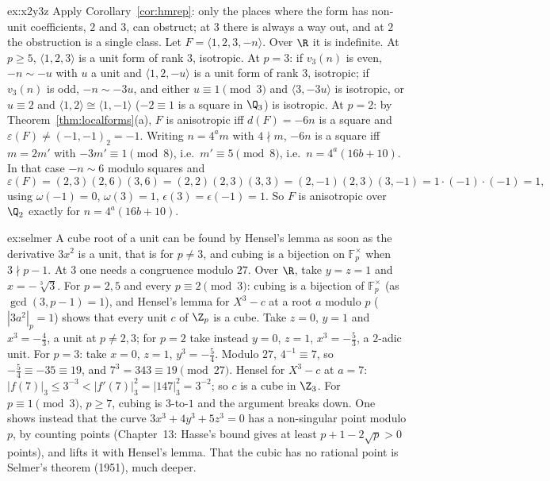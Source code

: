 \begin{solution}{ex:x2y3z}
\idea Apply Corollary~\ref{cor:hmrep}: only the places where the form has non-unit coefficients, $2$ and $3$, can obstruct; at $3$
there is always a way out, and at $2$ the obstruction is a single class.
\writeup Let $F=\langle1,2,3,-n\rangle$. Over $\R$ it is indefinite. At $p\ge5$, $\langle1,2,3\rangle$ is a unit form of rank $3$, isotropic.
At $p=3$: if $v_3(n)$ is even, $-n\sim-u$ with $u$ a unit and $\langle1,2,-u\rangle$ is a unit form of rank $3$, isotropic; if $v_3(n)$
is odd, $-n\sim-3u$, and either $u\equiv1\pmod3$ and $\langle3,-3u\rangle$ is isotropic, or $u\equiv2$ and $\langle1,2\rangle\cong
\langle1,-1\rangle$ ($-2\equiv1$ is a square in $\Q_3$) is isotropic. At $p=2$: by Theorem~\ref{thm:localforms}(a), $F$ is anisotropic
iff $d(F)=-6n$ is a square and $\varepsilon(F)\ne(-1,-1)_2=-1$. Writing $n=4^am$ with $4\nmid m$, $-6n$ is a square iff $m=2m'$ with
$-3m'\equiv1\pmod8$, i.e.\ $m'\equiv5\pmod8$, i.e.\ $n=4^a(16b+10)$. In that case $-n\sim6$ modulo squares and
\[
\varepsilon(F)=(2,3)(2,6)(3,6)=(2,2)(2,3)(3,3)=(2,-1)(2,3)(3,-1)=1\cdot(-1)\cdot(-1)=1,
\]
using $\omega(-1)=0$, $\omega(3)=1$, $\epsilon(3)=\epsilon(-1)=1$. So $F$ is anisotropic over $\Q_2$ exactly for $n=4^a(16b+10)$.
\end{solution}

\begin{solution}{ex:selmer}
\idea A cube root of a unit can be found by Hensel's lemma as soon as the derivative $3x^2$ is a unit, that is for $p\ne3$, and
cubing is a bijection on $\mathbb F_p^\times$ when $3\nmid p-1$. At $3$ one needs a congruence modulo $27$.
\writeup Over $\R$, take $y=z=1$ and $x=-\sqrt[3]3$. For $p=2,5$ and every $p\equiv2\pmod3$: cubing is a bijection of
$\mathbb F_p^\times$ (as $\gcd(3,p-1)=1$), and Hensel's lemma for $X^3-c$ at a root $a$ modulo $p$ ($|3a^2|_p=1$) shows that every
unit $c$ of $\Z_p$ is a cube. Take $z=0$, $y=1$ and $x^3=-\frac43$, a unit at $p\ne2,3$; for $p=2$ take instead $y=0$, $z=1$,
$x^3=-\frac53$, a $2$-adic unit. For $p=3$: take $x=0$, $z=1$, $y^3=-\frac54$. Modulo $27$, $4^{-1}\equiv7$, so $-\frac54\equiv-35
\equiv19$, and $7^3=343\equiv19\pmod{27}$. Hensel for $X^3-c$ at $a=7$: $|f(7)|_3\le3^{-3}<|f'(7)|_3^2=|147|_3^2=3^{-2}$; so $c$ is a
cube in $\Z_3$. For $p\equiv1\pmod3$, $p\ge7$, cubing is $3$-to-$1$ and the argument breaks down. One shows instead that the curve
$3x^3+4y^3+5z^3=0$ has a non-singular point modulo $p$, by counting points (Chapter~13: Hasse's bound gives at least $p+1-2\sqrt p>0$
points), and lifts it with Hensel's lemma. That the cubic has no rational point is Selmer's theorem (1951), much deeper.
\end{solution}

